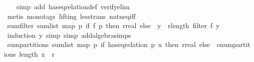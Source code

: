 \begin{isabellebody}
%
\isadelimproof
\ \ %
\endisadelimproof
%
\isatagproof
{}\isamarkupfalse%
\ {\isacharparenleft}{\kern0pt}simp\ add{\isacharcolon}{\kern0pt}\ has{\isacharunderscore}{\kern0pt}eq{\isacharunderscore}{\kern0pt}relation{\isacharunderscore}{\kern0pt}def\ verify{\isacharunderscore}{\kern0pt}elim{\isacharparenright}{\kern0pt}\ \isanewline
\ \ \isamarkupfalse%
\ {\isacharparenleft}{\kern0pt}metis\ {\isacharparenleft}{\kern0pt}mono{\isacharunderscore}{\kern0pt}tags{\isacharcomma}{\kern0pt}\ lifting{\isacharparenright}{\kern0pt}\ less{\isacharunderscore}{\kern0pt}trans\ nat{\isacharunderscore}{\kern0pt}neq{\isacharunderscore}{\kern0pt}iff{\isacharparenright}{\kern0pt}%
\endisatagproof
{\isafoldproof}%
%
\isadelimproof
\isanewline
%
\endisadelimproof
\isanewline
{}\isamarkupfalse%
\ sum{\isacharunderscore}{\kern0pt}filter{\isacharcolon}{\kern0pt}\ {\isachardoublequoteopen}sum{\isacharunderscore}{\kern0pt}list\ {\isacharparenleft}{\kern0pt}map\ {\isacharparenleft}{\kern0pt}{\isasymlambda}p{\isachardot}{\kern0pt}\ if\ f\ p\ then\ {\isacharparenleft}{\kern0pt}r{\isacharcolon}{\kern0pt}{\isacharcolon}{\kern0pt}real{\isacharparenright}{\kern0pt}\ else\ {}{\isacharparenright}{\kern0pt}\ y{\isacharparenright}{\kern0pt}\ {\isacharequal}{\kern0pt}\ r{\isacharasterisk}{\kern0pt}{\isacharparenleft}{\kern0pt}length\ {\isacharparenleft}{\kern0pt}filter\ f\ y{\isacharparenright}{\kern0pt}{\isacharparenright}{\kern0pt}{\isachardoublequoteclose}\isanewline
%
\isadelimproof
\ \ %
\endisadelimproof
%
\isatagproof
{}\isamarkupfalse%
\ {\isacharparenleft}{\kern0pt}induction\ y{\isacharcomma}{\kern0pt}\ simp{\isacharcomma}{\kern0pt}\ simp\ add{\isacharcolon}{\kern0pt}algebra{\isacharunderscore}{\kern0pt}simps{\isacharparenright}{\kern0pt}%
\endisatagproof
{\isafoldproof}%
%
\isadelimproof
\isanewline
%
\endisadelimproof
\isanewline
{}\isamarkupfalse%
\ sum{\isacharunderscore}{\kern0pt}partitions{\isacharcolon}{\kern0pt}\ {\isachardoublequoteopen}sum{\isacharunderscore}{\kern0pt}list\ {\isacharparenleft}{\kern0pt}map\ {\isacharparenleft}{\kern0pt}{\isasymlambda}p{\isachardot}{\kern0pt}\ if\ has{\isacharunderscore}{\kern0pt}eq{\isacharunderscore}{\kern0pt}relation\ p\ x\ then\ {\isacharparenleft}{\kern0pt}r{\isacharcolon}{\kern0pt}{\isacharcolon}{\kern0pt}real{\isacharparenright}{\kern0pt}\ else\ {}{\isacharparenright}{\kern0pt}\ {\isacharparenleft}{\kern0pt}enum{\isacharunderscore}{\kern0pt}partitions\ {\isacharparenleft}{\kern0pt}length\ x{\isacharparenright}{\kern0pt}{\isacharparenright}{\kern0pt}{\isacharparenright}{\kern0pt}\ {\isacharequal}{\kern0pt}\ r{\isachardoublequoteclose}\isanewline

\end{isabellebody}
